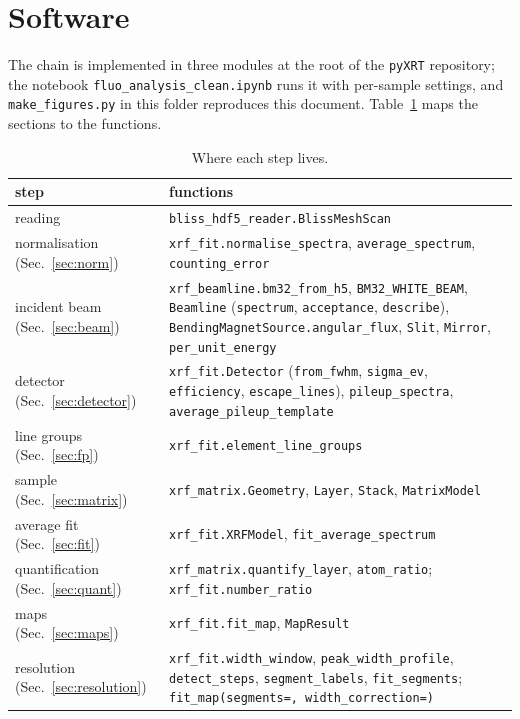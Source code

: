 \documentclass[11pt,a4paper]{article}
\newcommand{\code}[1]{\texttt{#1}}
\begin{document}
\appendix
\section{Software}\label{sec:software}
The chain is implemented in three modules at the root of the \code{pyXRT} repository; the notebook
\code{fluo\_analysis\_clean.ipynb} runs it with per-sample settings, and \code{make\_figures.py} in this
folder reproduces this document. Table~\ref{tab:software} maps the sections to the functions.

\begin{table}[h]
\centering\small
\caption{Where each step lives.}
\label{tab:software}
\begin{tabularx}{\linewidth}{>{\raggedright\arraybackslash}p{4.2cm}X}
\toprule
step & functions\\
\midrule
reading & \code{bliss\_hdf5\_reader.BlissMeshScan}\\
normalisation (Sec.~\ref{sec:norm}) & \code{xrf\_fit.normalise\_spectra}, \code{average\_spectrum}, \code{counting\_error}\\
incident beam (Sec.~\ref{sec:beam}) & \code{xrf\_beamline.bm32\_from\_h5}, \code{BM32\_WHITE\_BEAM}, \code{Beamline}
(\code{spectrum}, \code{acceptance}, \code{describe}), \code{BendingMagnetSource.angular\_flux}, \code{Slit},
\code{Mirror}, \code{per\_unit\_energy}\\
detector (Sec.~\ref{sec:detector}) & \code{xrf\_fit.Detector} (\code{from\_fwhm}, \code{sigma\_ev}, \code{efficiency}, \code{escape\_lines}),
\code{pileup\_spectra}, \code{average\_pileup\_template}\\
line groups (Sec.~\ref{sec:fp}) & \code{xrf\_fit.element\_line\_groups}\\
sample (Sec.~\ref{sec:matrix}) & \code{xrf\_matrix.Geometry}, \code{Layer}, \code{Stack}, \code{MatrixModel}\\
average fit (Sec.~\ref{sec:fit}) & \code{xrf\_fit.XRFModel}, \code{fit\_average\_spectrum}\\
quantification (Sec.~\ref{sec:quant}) & \code{xrf\_matrix.quantify\_layer}, \code{atom\_ratio}; \code{xrf\_fit.number\_ratio}\\
maps (Sec.~\ref{sec:maps}) & \code{xrf\_fit.fit\_map}, \code{MapResult}\\
resolution (Sec.~\ref{sec:resolution}) & \code{xrf\_fit.width\_window}, \code{peak\_width\_profile}, \code{detect\_steps},
\code{segment\_labels}, \code{fit\_segments}; \code{fit\_map(segments=, width\_correction=)}\\
\bottomrule
\end{tabularx}
\end{table}
\end{document}
